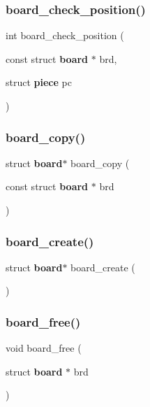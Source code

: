\mbox{\label{board_8c_af76d449d544ab57f7adaa2bf4d89b060}} 
\subsubsection{board\+\_\+check\+\_\+position()}
{\footnotesize\ttfamily int board\+\_\+check\+\_\+position (\begin{DoxyParamCaption}\item[{const struct \textbf{ board} $\ast$}]{brd,  }\item[{struct \textbf{ piece}}]{pc }\end{DoxyParamCaption})\hspace{0.3cm}{\ttfamily [inline]}}

\mbox{\label{board_8c_a1e27212e0cf664697c846562ae704dc2}} 
\subsubsection{board\+\_\+copy()}
{\footnotesize\ttfamily struct \textbf{ board}$\ast$ board\+\_\+copy (\begin{DoxyParamCaption}\item[{const struct \textbf{ board} $\ast$}]{brd }\end{DoxyParamCaption})}

\mbox{\label{board_8c_a590e915531ea7b532175b43fac0aa3a2}} 
\subsubsection{board\+\_\+create()}
{\footnotesize\ttfamily struct \textbf{ board}$\ast$ board\+\_\+create (\begin{DoxyParamCaption}{ }\end{DoxyParamCaption})}

\mbox{\label{board_8c_a29ce3ebc1a2bd8e6d1dce7e45c4cf3df}} 
\subsubsection{board\+\_\+free()}
{\footnotesize\ttfamily void board\+\_\+free (\begin{DoxyParamCaption}\item[{struct \textbf{ board} $\ast$}]{brd }\end{DoxyParamCaption})\hspace{0.3cm}{\ttfamily [inline]}}

